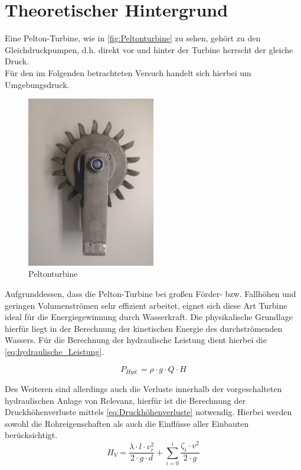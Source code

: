 \section{Theoretischer Hintergrund}
Eine Pelton-Turbine, wie in \autoref{fig:Peltonturbine} zu sehen, gehört zu den Gleichdruckpumpen, d.h. direkt vor und hinter der Turbine herrscht der gleiche Druck.\\
Für den im Folgenden betrachteten Versuch handelt sich hierbei um Umgebungsdruck.\\
\begin{figure}[H]
    \centering
    \includegraphics[width=0.5\textwidth]{Abbildungen/Peltonturbine.jpeg}
    \caption{Peltonturbine}
    \label{fig:Peltonturbine}
\end{figure}

Aufgrunddessen, dass die Pelton-Turbine bei großen Förder- bzw. Fallhöhen und geringen Volumenströmen sehr effizient arbeitet,
eignet sich diese Art Turbine ideal für die Energiegewinnung durch Wasserkraft.
Die physikalische Grundlage hierfür liegt in der Berechnung der kinetischen Energie des durchströmenden Wassers.
Für die Berechnung der hydraulische Leistung dient hierbei die \autoref{eq:hydraulische_Leistung}.

\begin{equation}
    P_{Hyd.} = \rho \cdot g \cdot Q \cdot H
    \label{eq:hydraulische_Leistung}
  \end{equation}

Des Weiteren sind allerdings auch die Verluste innerhalb der vorgeschalteten hydraulischen Anlage von Relevanz,
hierfür ist die Berechnung der Druckhöhenverluste mittels \autoref{eq:Druckhöhenverluste} notwendig.
Hierbei werden sowohl die Rohreigenschaften als auch die Einflüsse aller Einbauten berücksichtigt.
\begin{equation}
    H_{V} = \frac{\lambda \cdot l \cdot v_{r}^2}{2 \cdot g \cdot d} + \sum_{i=0}^{i} \frac{\zeta_{i} \cdot v^2}{2 \cdot g}
    \label{eq:Druckhöhenverluste}
\end{equation}

